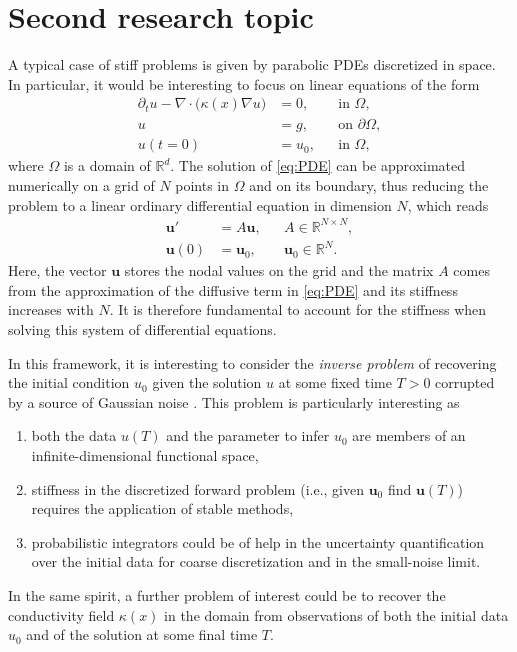 \documentclass{siamart1116}
\newcommand{\R}{\mathbb{R}}
\begin{document}
\section*{Second research topic} A typical case of stiff problems is given by parabolic PDEs discretized in space. In particular, it would be interesting to focus on linear equations of the form
\begin{equation}\label{eq:PDE}
\begin{aligned}
	\partial_t u - \nabla \cdot \big(\kappa(x) \nabla u\big) &= 0, && \text{in } \Omega, \\
	u &= g, && \text{on } \partial \Omega, \\
	u(t = 0) &= u_0, && \text{in } \Omega,
\end{aligned}
\end{equation}
where $\Omega$ is a domain of $\R^d$. The solution of \eqref{eq:PDE} can be approximated numerically on a grid of $N$ points in $\Omega$ and on its boundary, thus reducing the problem to a linear ordinary differential equation in dimension $N$, which reads
\begin{equation*}
\begin{aligned}
	\mathbf{u}' &= A\mathbf{u}, && A \in \R^{N\times N},\\
	\mathbf{u}(0) &= \mathbf{u}_0, && \mathbf{u}_0 \in \R^N. 
\end{aligned}	
\end{equation*}
Here, the vector $\mathbf{u}$ stores the nodal values on the grid and the matrix $A$ comes from the approximation of the diffusive term in \eqref{eq:PDE} and its stiffness increases with $N$. It is therefore fundamental to account for the stiffness when solving this system of differential equations.

In this framework, it is interesting to consider the \textit{inverse problem} of recovering the initial condition $u_0$ given the solution $u$ at some fixed time $T > 0$ corrupted by a source of Gaussian noise \cite{DaS13, Stu10}. This problem is particularly interesting as 
\begin{enumerate}
	\item both the data $u(T)$ and the parameter to infer $u_0$ are members of an infinite-dimensional functional space,
	\item stiffness in the discretized forward problem (i.e., given $\mathbf{u}_0$ find $\mathbf{u}(T)$) requires the application of stable methods,
	\item probabilistic integrators could be of help in the uncertainty quantification over the initial data for coarse discretization and in the small-noise limit.
\end{enumerate}
In the same spirit, a further problem of interest could be to recover the conductivity field $\kappa(x)$ in the domain from observations of both the initial data $u_0$ and of the solution at some final time $T$.
\end{document}
